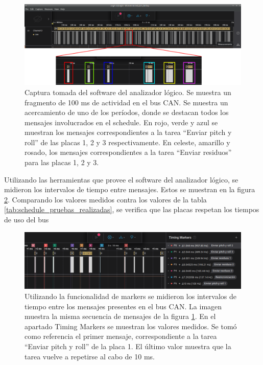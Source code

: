 \begin{figure}[htb]
    \centering
    \includegraphics[width=\textwidth]{img/resultados_timing_sin_fallas_zoom.png}
    \caption{Captura tomada del software del analizador lógico. Se muestra un fragmento de 100 ms de actividad en el bus CAN. Se muestra un acercamiento de uno de los períodos, donde se destacan todos los mensajes involucrados en el schedule. En rojo, verde y azul se muestran los mensajes correspondientes a la tarea ``Enviar pitch y roll'' de las placas 1, 2 y 3 respectivamente. En celeste, amarillo y rosado, los mensajes correspondientes a la tarea ``Enviar residuos'' para las placas 1, 2 y 3.}
    \label{fig:resultados_timing_sin_fallas}
\end{figure}

Utilizando las herramientas que provee el software del analizador lógico, se midieron los intervalos de tiempo entre mensajes. Estos se muestran en la figura \ref{fig:resultados_timing_detalle_sin_fallas}. Comparando los valores medidos contra los valores de la tabla \ref{tab:schedule_pruebas_realizadas}, se verifica que las placas respetan los tiempos de uso del bus

\begin{figure}[htb]
    \centering
    \includegraphics[width=\textwidth]{img/resultados_timing_detalle_sin_fallas.png}
    \caption{Utilizando la funcionalidad de markers se midieron los intervalos de tiempo entre los mensajes presentes en el bus CAN. La imagen muestra la misma secuencia de mensajes de la figura \ref{fig:resultados_timing_sin_fallas}. En el apartado Timing Markers se muestran los valores medidos. Se tomó como referencia el primer mensaje, correspondiente a la tarea ``Enviar pitch y roll'' de la placa 1. El último valor muestra que la tarea vuelve a repetirse al cabo de 10 ms.}
    \label{fig:resultados_timing_detalle_sin_fallas}
\end{figure}


